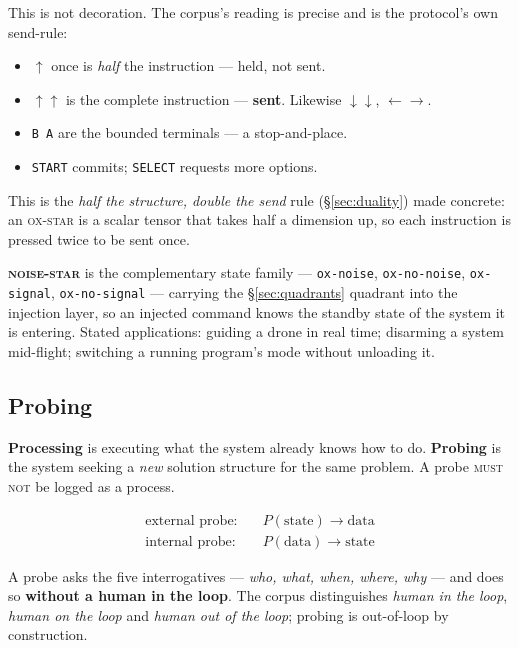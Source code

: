 \documentclass[11pt,a4paper]{article}
\newcommand{\MUSTNOT}{\textsc{must not}}
\begin{document}
This is not decoration. The corpus's reading is precise and is the protocol's
own send-rule:

\begin{itemize}[leftmargin=*,noitemsep]
  \item $\uparrow$ once is \emph{half} the instruction --- held, not sent.
  \item $\uparrow\uparrow$ is the complete instruction --- \textbf{sent}.
    Likewise $\downarrow\downarrow$, $\leftarrow\rightarrow$.
  \item \texttt{B A} are the bounded terminals --- a stop-and-place.
  \item \texttt{START} commits; \texttt{SELECT} requests more options.
\end{itemize}

This is the \emph{half the structure, double the send} rule
(\S\ref{sec:duality}) made concrete: an \textsc{ox-star} is a scalar tensor that
takes half a dimension up, so each instruction is pressed twice to be sent once.

\textbf{\textsc{noise-star}} is the complementary state family ---
\texttt{ox-noise}, \texttt{ox-no-noise}, \texttt{ox-signal},
\texttt{ox-no-signal} --- carrying the \S\ref{sec:quadrants} quadrant into the
injection layer, so an injected command knows the standby state of the system it
is entering. Stated applications: guiding a drone in real time; disarming a
system mid-flight; switching a running program's mode without unloading it.

\subsection{Probing}
\label{sec:probe}

\textbf{Processing} is executing what the system already knows how to do.
\textbf{Probing} is the system seeking a \emph{new} solution structure for the
same problem. A probe \MUSTNOT{} be logged as a process.

\begin{align*}
\text{external probe:}&\quad P(\text{state}) \rightarrow \text{data} \\
\text{internal probe:}&\quad P(\text{data}) \rightarrow \text{state}
\end{align*}

A probe asks the five interrogatives --- \emph{who, what, when, where, why} ---
and does so \textbf{without a human in the loop}. The corpus distinguishes
\emph{human in the loop}, \emph{human on the loop} and \emph{human out of the
loop}; probing is out-of-loop by construction.
\end{document}
